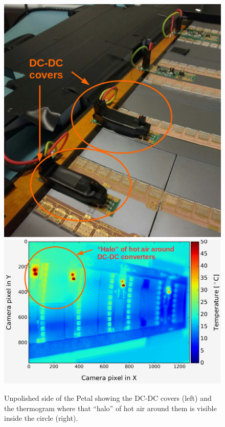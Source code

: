 		\begin{figure}[ht!]
			\centering
			\captionsetup{justification=centering,margin=2cm}
			\includegraphics[scale=0.33]{Figures/Chapter02/DCDC_covers.jpg}
			\includegraphics[scale=0.46]{Figures/Chapter02/HaloThermogram.jpg}
			\caption{Unpolished side of the Petal showing the DC-DC covers (left) and the thermogram where that “halo” of hot air around them is visible inside the circle (right).}\label{fig2.8}
		\end{figure}
	

